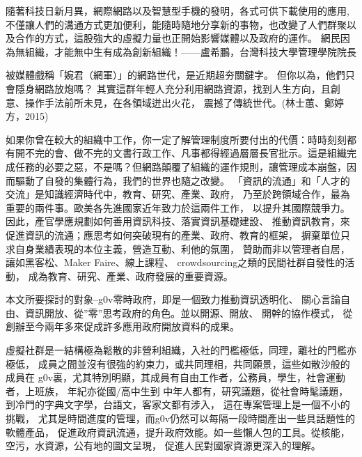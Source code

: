 隨著科技日新月異，網際網路以及智慧型手機的發明，各式可供下載使用的應用, 不僅讓人們的溝通方式更加便利，能隨時隨地分享新的事物，也改變了人們群聚以及合作的方式，這股強大的虛擬力量也正開始影響媒體以及政府的運作。
網民因為無組織，才能無中生有成為創新組織！——盧希鵬，台灣科技大學管理學院院長







被媒體戲稱「婉君（網軍）」的網路世代，是近期超夯關鍵字。
但你以為，他們只會隱身網路放炮嗎？
其實這群年輕人充分利用網路資源，找到人生方向，且創意、操作手法前所未見，在各領域迸出火花，
震撼了傳統世代。(林士蕙、鄭婷方，2015)


如果你曾在較大的組織中工作，你一定了解管理制度所要付出的代價：時時刻刻都有開不完的會、做不完的文書行政工作、凡事都得經過層層長官批示。這是組織完成任務的必要之惡，不是嗎？但網路顛覆了組織的運作規則，讓管理成本崩盤，因而驅動了自發的集體行為，我們的世界也隨之改變。
「資訊的流通」和「人才的交流」是知識經濟時代中，教育、研究、產業、政府，
乃至於跨領域合作，最為重要的兩件事。歐美各先進國家近年致力於這兩件工作，
以提升其國際競爭力。因此，產官學應規劃如何善用資訊科技、落實資訊基礎建設、
推動資訊教育，來促進資訊的流通；應思考如何突破現有的產業、政府、教育的框架，
摒棄單位只求自身業績表現的本位主義，營造互動、利他的氛圍，
贊助而非以管理者自居，讓如黑客松、Maker Faire、線上課程、
crowdsourcing之類的民間社群自發性的活動，
成為教育、研究、產業、政府發展的重要資源。


本文所要探討的對象--g0v零時政府，即是一個致力推動資訊透明化、
關心言論自由、資訊開放、從”零”思考政府的角色。並以開源、開放、
開幹的協作模式， 從創辦至今兩年多來促成許多應用政府開放資料的成果。


虛擬社群是一結構極為鬆散的非營利組織，入社的門檻極低，同理，離社的門檻亦極低，
成員之間並沒有很強的約束力，或共同理相，共同願景，這些如散沙般的成員在
g0v裏，尤其特別明顯，其成員有自由工作者，公務員，學生，社會運動者，上班族，
年紀亦從國/高中生到
中年人都有，研究議題，從社會時髦議題，到冷門的字典文字學，台語文，客家文都有涉入，
這在專案管理上是一個不小的挑戰，
尤其是時間進度的管理，而g0v仍然可以每隔一段時間產出一些具話題性的軟體產品，
促進政府資訊流通，提升政府效能。如一些懶人包的工具。從核能，空污，水資源，公有地的圖文呈現，
促進人民對國家資源更深入的理解。






